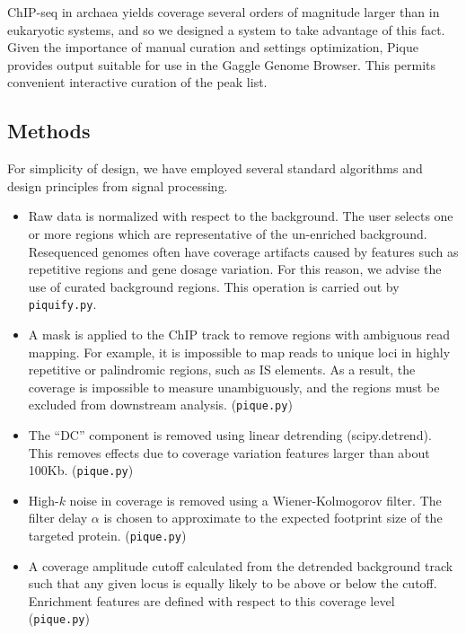 \documentclass{bioinfo}
\begin{document}

ChIP-seq in archaea yields coverage several orders of magnitude larger
than in eukaryotic systems, and so we designed a system to take
advantage of this fact. Given the importance of manual curation and
settings optimization, Pique provides output suitable for use in the
Gaggle Genome Browser. This permits convenient interactive curation of
the peak list. 

\begin{methods}
\section{Methods}

For simplicity of design, we have employed several standard algorithms
and design principles from signal processing.

\begin{itemize}

\item Raw data is normalized with respect to the background. The user
  selects one or more regions which are representative of the
  un-enriched background. Resequenced genomes often have coverage
  artifacts caused by features such as repetitive regions and gene
  dosage variation. For this reason, we advise the use of curated
  background regions. This operation is carried out by
  \texttt{piquify.py}.

\item A mask is applied to the ChIP track to remove regions with
  ambiguous read mapping. For example, it is impossible to map reads
  to unique loci in highly repetitive or palindromic regions, such as
  IS elements. As a result, the coverage is impossible to measure
  unambiguously, and the regions must be excluded from downstream
  analysis. (\texttt{pique.py})

\item The ``DC'' component is removed using linear detrending
  (scipy.detrend). This removes effects due to coverage variation
  features larger than about 100Kb. (\texttt{pique.py})

\item High-$k$ noise in coverage is removed using a Wiener-Kolmogorov
  filter. The filter delay $\alpha$ is chosen to approximate to the
  expected footprint size of the targeted protein. (\texttt{pique.py})

\item A coverage amplitude cutoff calculated from the detrended
  background track such that any given locus is equally likely to be
  above or below the cutoff. Enrichment features are defined with
  respect to this coverage level (\texttt{pique.py})


\end{itemize}
\end{methods}
\end{document}
